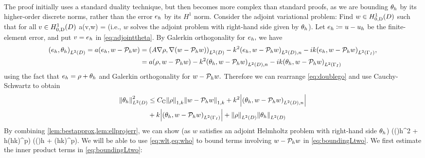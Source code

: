 The proof initially uses a standard duality technique, but then becomes more complex than standard proofs, as we are bounding $\theta_{h}$ by its higher-order discrete norms, rather than the error $e_{h}$ by its $H^1$ norm.
Consider the adjoint variational problem: Find $w \in \HozDD$ such that for all $v \in \HozDD$
\beq\label{eq:adjointtheta}
a(v,w) = 
\eeq
(i.e., $w$ solves the adjoint problem with right-hand side given by $\theta_{h}$). Let $e_{h} \coloneqq u -u_{h}$ be the finite-element error, and put $v = e_{h}$ in \cref{eq:adjointtheta}. By Galerkin orthogonality for $e_{h},$ we have
\begin{align}
\IPLtD{\eh}{\thetah} = a(\eh,w-\Ph w) &= \IPLtD{A \grad \rho}{\grad(w-\Ph w)}  -k^2 \IPLtDn{\eh}{w-\Ph w} -ik \IPLtGI{\eh}{w-\Ph w},\nonumber\\
&=a(\rho,w-\Ph w) -k^2 \IPLtDn{\thetah}{w-\Ph w} -ik \IPLtGI{\thetah}{w-\Ph w}\label{eq:doublego}
\end{align}
using the fact that $e_{h} = \rho + \theta_{h}$ and Galerkin orthogonality for $w - \mathcal P_{h} w.$ Therefore we can rearrange \cref{eq:doublego} and use Cauchy-Schwartz to obtain
\begin{align}
\NLtD{\thetah}^2 &\leq \Cc \NW{\rho} \NW{w- \Ph w} + k^2 \abs{\IPLtDn{\thetah}{w- \Ph w}}\nonumber\\
&+ k \abs{\IPLtGI{\thetah}{w-\Ph w}} + \NLtD{\rho}\NLtD{\thetah}\label{eq:boundingLtwo}
\end{align}
By combining \cref{lem:bestapprox,lem:ellprojerr}, we can show (as $w$ satisfies an adjoint Helmholtz problem with right-hand side $\theta_{h}$)
\beq\label{eq:wlt}
 \leq {} \mleft(\CFEMotilde {}\mleft(\mright)h^2 + \CFEMttilde \CAnk h(hk)^p\mright)\NLtD{\thetah} \tand
\eeq
\beq\label{eq:who}
  \mleft(\CFEMotilde {}\mleft(\mright)h + \CFEMttilde \CAnk (hk)^p\mright)\NLtD{\thetah}.
\eeq
We will be able to use \cref{eq:wlt,eq:who} to bound terms involving $w - \mathcal P_{h} w$ in \cref{eq:boundingLtwo}. We first estimate the inner product terms in \cref{eq:boundingLtwo}:
